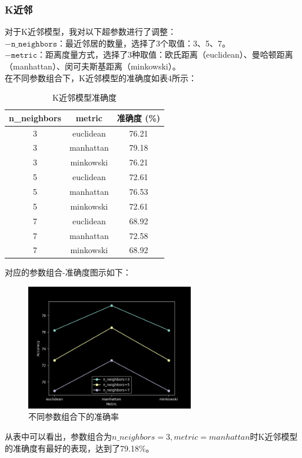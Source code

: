 \documentclass[12pt,a4paper]{article}
\begin{document}
\subsubsection{K近邻}
对于K近邻模型，我对以下超参数进行了调整：\\
$- \texttt{n\_neighbors}$：最近邻居的数量，选择了3个取值：3、5、7。\\
$- \texttt{metric}$：距离度量方式，选择了3种取值：欧氏距离（euclidean）、曼哈顿距离（manhattan）、闵可夫斯基距离（minkowski）。\\
在不同参数组合下，K近邻模型的准确度如表4所示：

\begin{table}[H]
    \centering
    \caption{K近邻模型准确度}
    \label{tab:knn_performance}
    \begin{tabular}{ccc}
      \toprule
      n\_neighbors & metric & 准确度 (\%) \\
      \midrule
      3 & euclidean & 76.21 \\
      3 & manhattan & 79.18 \\
      3 & minkowski & 76.21 \\
      5 & euclidean & 72.61 \\
      5 & manhattan & 76.53 \\
      5 & minkowski & 72.61 \\
      7 & euclidean & 68.92 \\
      7 & manhattan & 72.58 \\
      7 & minkowski & 68.92 \\
      \bottomrule
    \end{tabular}
\end{table}
对应的参数组合-准确度图示如下：
\begin{figure}[H]
    \centering
    \includegraphics[width=0.65\textwidth]{plot4.png}
    \caption{不同参数组合下的准确率}
\end{figure}
从表中可以看出，参数组合为$n\_neighbors = 3, metric = manhattan$时K近邻模型的准确度有最好的表现，达到了79.18\%。
\end{document}
